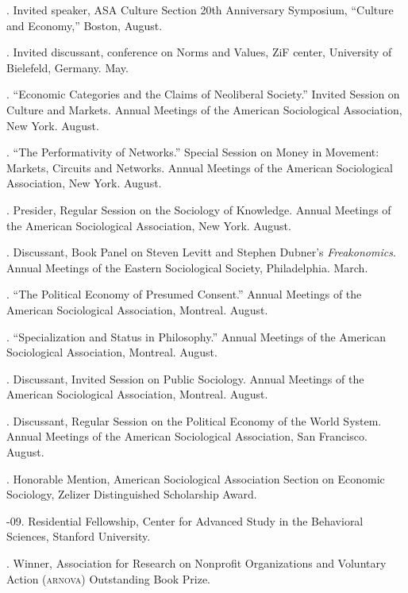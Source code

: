 \documentclass[11pt]{article}
\begin{document}
. Invited speaker, ASA Culture Section 20th Anniversary Symposium, ``Culture and Economy,'' Boston, August.

. Invited discussant, conference on Norms and Values, ZiF center, University of Bielefeld, Germany. May. 

. ``Economic Categories and the Claims of Neoliberal Society.'' Invited Session on Culture and Markets. Annual Meetings of the American Sociological Association, New York. August.

. ``The Performativity of Networks.'' Special Session on Money in Movement: Markets, Circuits and Networks. Annual Meetings of the American Sociological Association, New York. August.

. Presider, Regular Session on the Sociology of Knowledge. Annual Meetings of the American Sociological Association, New York. August.

. Discussant, Book Panel on Steven Levitt and Stephen Dubner's \emph{Freakonomics}. Annual Meetings of the Eastern Sociological Society, Philadelphia. March.

. ``The Political Economy of Presumed Consent.'' Annual Meetings of the American Sociological Association, Montreal. August.

. ``Specialization and Status in Philosophy.'' Annual Meetings of the American Sociological Association, Montreal. August.

. Discussant, Invited Session on Public Sociology. Annual Meetings of the American Sociological Association, Montreal. August.

. Discussant, Regular Session on the Political Economy of the World System. Annual Meetings of the American Sociological Association, San Francisco. August.


\bigskip

\medskip
  
. Honorable Mention, American Sociological Association Section on Economic Sociology, Zelizer Distinguished Scholarship Award.

-09. Residential Fellowship, Center for Advanced Study in the Behavioral Sciences, Stanford University.

. Winner, Association for Research on Nonprofit Organizations and Voluntary Action (\textsc{arnova}) Outstanding Book Prize.
\end{document}
